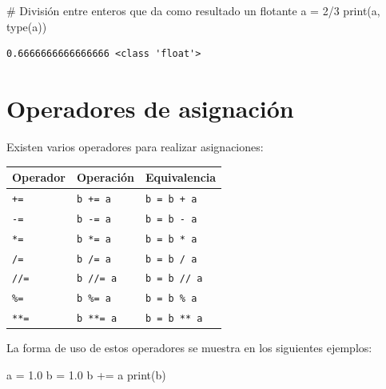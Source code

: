 \documentclass[
  spanish,
  letterpaper,
]{scrbook}
\newenvironment{Shaded}{\begin{snugshade}}{\end{snugshade}}
\newcommand{\BuiltInTok}[1]{\textcolor[rgb]{0.00,0.23,0.31}{#1}}
\newcommand{\CommentTok}[1]{\textcolor[rgb]{0.37,0.37,0.37}{#1}}
\newcommand{\DecValTok}[1]{\textcolor[rgb]{0.68,0.00,0.00}{#1}}
\newcommand{\FloatTok}[1]{\textcolor[rgb]{0.68,0.00,0.00}{#1}}
\newcommand{\NormalTok}[1]{\textcolor[rgb]{0.00,0.23,0.31}{#1}}
\newcommand{\OperatorTok}[1]{\textcolor[rgb]{0.37,0.37,0.37}{#1}}
\theoremstyle{definition}
\theoremstyle{remark}
\begin{document}
\begin{Shaded}
\begin{Highlighting}[]
\CommentTok{\# División entre enteros que da como resultado un flotante}
\NormalTok{a }\OperatorTok{=} \DecValTok{2}\OperatorTok{/}\DecValTok{3}
\BuiltInTok{print}\NormalTok{(a, }\BuiltInTok{type}\NormalTok{(a))}
\end{Highlighting}
\end{Shaded}

\begin{verbatim}
0.6666666666666666 <class 'float'>
\end{verbatim}

\section{Operadores de asignación}\label{operadores-de-asignaciuxf3n}

Existen varios operadores para realizar asignaciones:

\begin{longtable}[]{@{}lll@{}}
\toprule\noalign{}
Operador & Operación & Equivalencia \\
\midrule\noalign{}
\endhead
\bottomrule\noalign{}
\endlastfoot
\texttt{+=} & \texttt{b\ +=\ a} & \texttt{b\ =\ b\ +\ a} \\
\texttt{-=} & \texttt{b\ -=\ a} & \texttt{b\ =\ b\ -\ a} \\
\texttt{*=} & \texttt{b\ *=\ a} & \texttt{b\ =\ b\ *\ a} \\
\texttt{/=} & \texttt{b\ /=\ a} & \texttt{b\ =\ b\ /\ a} \\
\texttt{//=} & \texttt{b\ //=\ a} & \texttt{b\ =\ b\ //\ a} \\
\texttt{\%=} & \texttt{b\ \%=\ a} & \texttt{b\ =\ b\ \%\ a} \\
\texttt{**=} & \texttt{b\ **=\ a} & \texttt{b\ =\ b\ **\ a} \\
\end{longtable}

La forma de uso de estos operadores se muestra en los siguientes
ejemplos:

\begin{Shaded}
\begin{Highlighting}[]
\NormalTok{a }\OperatorTok{=} \FloatTok{1.0} 
\NormalTok{b }\OperatorTok{=} \FloatTok{1.0}
\NormalTok{b }\OperatorTok{+=}\NormalTok{ a  }
\BuiltInTok{print}\NormalTok{(b)}
\end{Highlighting}
\end{Shaded}
\end{document}
